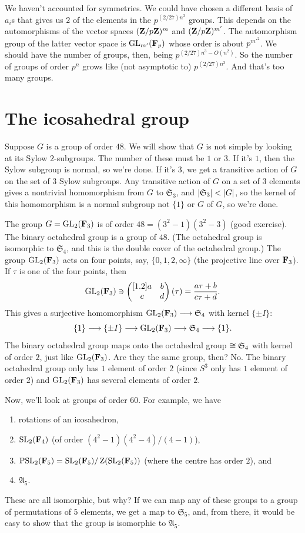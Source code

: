 \documentclass[11pt, twoside]{amsart}
\begin{document}
We haven't accounted for symmetries. We could have chosen a different basis of $a_i$s that gives us $2$ of the elements in the $p^{(2/27) n^3}$ groups. This depends on the automorphisms of the vector spaces $(\mathbf{Z}/p\mathbf{Z})^m$ and $(\mathbf{Z}/p\mathbf{Z})^{m'}$. The automorphism group of the latter vector space is $\operatorname{GL}_{m'}(\mathbf F_p)$ whose order is about $p^{m'^2}$. We should have the number of groups, then, being $p^{(2/27) n^3 - O(n^2)}$. So the number of groups of order $p^n$ grows like (not asymptotic to) $p^{(2/27) n^3}$. And that's too many groups.

\section{The icosahedral group}
Suppose $G$ is a group of order $48$. We will show that $G$ is not simple by looking at its Sylow $2$-subgroups. The number of these must be $1$ or $3$. If it's $1$, then the Sylow subgroup is normal, so we're done. If it's $3$, we get a transitive action of $G$ on the set of $3$ Sylow subgroups. Any transitive action of $G$ on a set of $3$ elements gives a nontrivial homomorphism from $G$ to $\mathfrak{S}_3$, and $\left \lvert \mathfrak{S}_3 \right \rvert < \left \lvert G \right \rvert$, so the kernel of this homomorphism is a normal subgroup not $\{1\}$ or $G$ of $G$, so we're done.

The group $G = \operatorname{GL}_2 (\mathbf F_3)$ is of order $48 = (3^2-1)(3^2-3)$ (good exercise). The binary octahedral group is a group of $48$. (The octahedral group is isomorphic to $\mathfrak{S}_4$, and this is the double cover of the octahedral group.) The group $\operatorname{GL}_2(\mathbf F_3)$ acts on four points, say, $\{0,1,2,\infty\}$ (the projective line over $\mathbf F_3$). If $\tau$ is one of the four points, then 
$$
\operatorname{GL}_2(\mathbf F_3) \ni \begin{pmatrix} [1.2] a&b\\c&d\end{pmatrix} (\tau) = \frac{a\tau + b}{c\tau + d}.
$$
This gives a surjective homomorphism $\operatorname{GL}_2(\mathbf F_3) \longrightarrow \mathfrak{S}_4$ with kernel $\{\pm I\}$:
$$
\{1 \} \longrightarrow \{\pm I\} \longrightarrow \operatorname{GL}_2(\mathbf F_3) \longrightarrow \mathfrak{S}_4 \longrightarrow \{1\}.
$$
The binary octahedral group maps onto the octahedral group $\cong \mathfrak{S}_4$ with kernel of order $2$, just like $\operatorname{GL}_2(\mathbf F_3)$. Are they the same group, then? No. The binary octahedral group only has $1$ element of order $2$ (since $S^3$ only has $1$ element of order $2$) and $\operatorname{GL}_2(\mathbf F_3)$ has several elements of order $2$.

Now, we'll look at groups of order $60$. For example, we have
\begin{enumerate}
\item rotations of an icosahedron,
\item $\operatorname{SL}_2(\mathbf F_4)$ (of order $(4^2-1)(4^2-4)/(4-1)$),
\item $\operatorname{PSL}_2(\mathbf F_5) = \operatorname{SL}_2(\mathbf F_5) / \operatorname{Z}(\operatorname{SL}_2(\mathbf F_5))$ (where the centre has order $2$), and
\item $\mathfrak{A}_5$.
\end{enumerate}
These are all isomorphic, but why? If we can map any of these groups to a group of permutations of $5$ elements, we get a map to $\mathfrak{S}_5$, and, from there, it would be easy to show that the group is isomorphic to $\mathfrak{A}_5$. 
\end{document}
